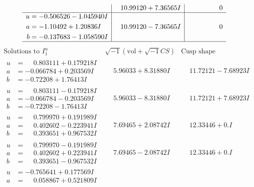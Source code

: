 \documentclass[1p]{elsarticle_modified}
\theoremstyle{definition}
\newcommand{\I}{\sqrt{-1}}
\begin{document}
$$\begin{array}{c|c|c}
 & \phantom{-}10.99120 + 7.36565 I & \phantom{-0.000000 } 0 \\ \hline\begin{aligned}
u &= -0.506526 - 1.045940 I \\
a &= -1.10492 + 1.20836 I \\
b &= -0.137683 - 1.058590 I\end{aligned}
 & \phantom{-}10.99120 - 7.36565 I & \phantom{-0.000000 } 0\\
 \hline 
 \end{array}$$\newpage$$\begin{array}{c|c|c}  
\text{Solutions to }I^u_{1}& \I (\text{vol} + \sqrt{-1}CS) & \text{Cusp shape}\\
 \hline 
\begin{aligned}
u &= \phantom{-}0.803111 + 0.179218 I \\
a &= -0.066784 + 0.203569 I \\
b &= -0.72208 + 1.76413 I\end{aligned}
 & \phantom{-}5.96033 + 8.31880 I & \phantom{-}11.72121 - 7.68923 I \\ \hline\begin{aligned}
u &= \phantom{-}0.803111 - 0.179218 I \\
a &= -0.066784 - 0.203569 I \\
b &= -0.72208 - 1.76413 I\end{aligned}
 & \phantom{-}5.96033 - 8.31880 I & \phantom{-}11.72121 + 7.68923 I \\ \hline\begin{aligned}
u &= \phantom{-}0.799970 + 0.191989 I \\
a &= \phantom{-}0.402602 - 0.223941 I \\
b &= \phantom{-}0.393651 + 0.967532 I\end{aligned}
 & \phantom{-}7.69465 + 2.08742 I & \phantom{-}12.33446 + 0. I\phantom{ +0.000000I} \\ \hline\begin{aligned}
u &= \phantom{-}0.799970 - 0.191989 I \\
a &= \phantom{-}0.402602 + 0.223941 I \\
b &= \phantom{-}0.393651 - 0.967532 I\end{aligned}
 & \phantom{-}7.69465 - 2.08742 I & \phantom{-}12.33446 + 0. I\phantom{ +0.000000I} \\ \hline\begin{aligned}
u &= -0.765641 + 0.177569 I \\
a &= \phantom{-}0.058867 + 0.521809 I \\

\end{aligned}
\end{array}$$
\end{document}
